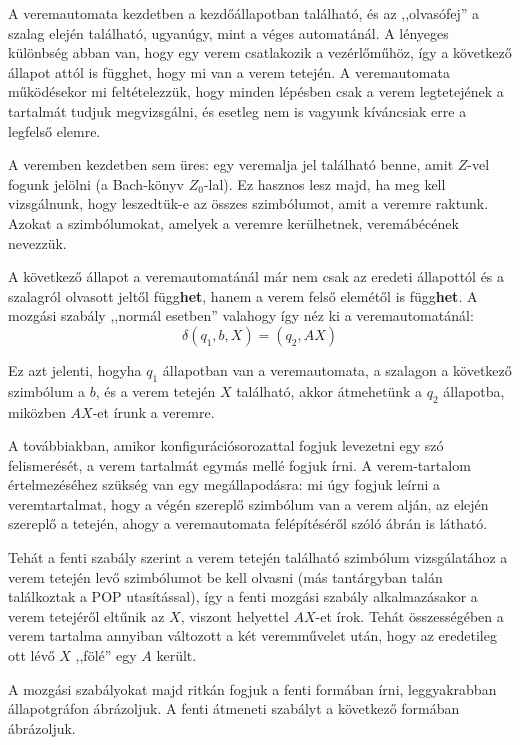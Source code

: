 \documentclass[a4paper]{article}
\begin{document}
\vspace{.6em}

A veremautomata kezdetben a kezdőállapotban található, és az
,,olvasófej'' a szalag elején található, ugyanúgy, mint a véges
automatánál. A lényeges különbség abban van, hogy egy verem csatlakozik
a vezérlőműhöz, így a következő állapot attól is függhet, hogy mi van a
verem tetején. A veremautomata működésekor mi feltételezzük, hogy
minden lépésben csak a verem legtetejének a tartalmát tudjuk
megvizsgálni, és esetleg nem is vagyunk kíváncsiak erre a legfelső
elemre.

A veremben kezdetben sem üres: egy veremalja jel található benne, amit
$Z$-vel fogunk jelölni (a Bach-könyv $Z_0$-lal). Ez hasznos lesz majd,
ha meg kell vizsgálnunk, hogy leszedtük-e az összes szimbólumot, amit a
veremre raktunk. Azokat a szimbólumokat, amelyek a veremre kerülhetnek,
veremábécének nevezzük.

A következő állapot a veremautomatánál már nem csak az eredeti
állapottól és a szalagról olvasott jeltől függ\textbf{het}, hanem a
verem felső elemétől is függ\textbf{het}. A mozgási szabály ,,normál
esetben'' valahogy így néz ki a veremautomatánál:
\[\delta(q_1, b, X) = (q_2, AX)\]

Ez azt jelenti, hogyha $q_1$ állapotban van a veremautomata, a szalagon
a következő szimbólum a $b$, és a verem tetején $X$ található, akkor
átmehetünk a $q_2$ állapotba, miközben $AX$-et írunk a veremre.

A továbbiakban, amikor konfigurációsorozattal fogjuk levezetni egy szó
felismerését, a verem tartalmát egymás mellé fogjuk írni. A
verem-tartalom értelmezéséhez szükség van egy megállapodásra: mi úgy
fogjuk leírni a veremtartalmat, hogy a végén szereplő szimbólum van a
verem alján, az elején szereplő a tetején, ahogy a veremautomata
felépítéséről szóló ábrán is látható.

Tehát a fenti szabály szerint a verem tetején található szimbólum
vizsgálatához a verem tetején levő szimbólumot be kell olvasni (más
tantárgyban talán találkoztak a POP utasítással), így a fenti mozgási
szabály alkalmazásakor a verem tetejéről eltűnik az $X$, viszont
helyettel $AX$-et írok. Tehát összességében a verem tartalma annyiban
változott a két veremművelet után, hogy az eredetileg ott lévő $X$
,,fölé'' egy $A$ került.

A mozgási szabályokat majd ritkán fogjuk a fenti formában írni,
leggyakrabban állapotgráfon ábrázoljuk. A fenti átmeneti szabályt a
következő formában ábrázoljuk.
\end{document}
